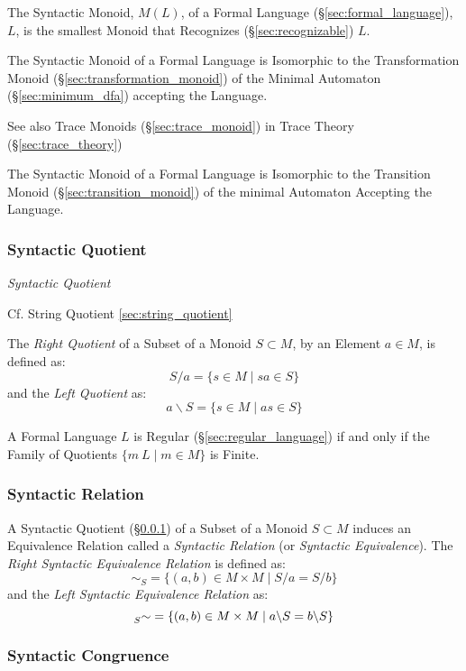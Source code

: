 The Syntactic Monoid, $M(L)$, of a Formal Language
(\S\ref{sec:formal_language}), $L$, is the smallest Monoid that
Recognizes (\S\ref{sec:recognizable}) $L$.

The Syntactic Monoid of a Formal Language is Isomorphic to the
Transformation Monoid (\S\ref{sec:transformation_monoid}) of the
Minimal Automaton (\S\ref{sec:minimum_dfa}) accepting the Language.

\fist See also Trace Monoids (\S\ref{sec:trace_monoid}) in Trace
Theory (\S\ref{sec:trace_theory})

The Syntactic Monoid of a Formal Language is Isomorphic to the
Transition Monoid (\S\ref{sec:transition_monoid}) of the minimal
Automaton Accepting the Language.



\subsubsection{Syntactic Quotient}\label{sec:syntactic_quotient}

\emph{Syntactic Quotient}

\fist Cf. String Quotient \ref{sec:string_quotient}

The \emph{Right Quotient} of a Subset of a Monoid $S \subset M$, by an
Element $a \in M$, is defined as:
\[
  S / a = \{ s \in M\;|\;sa \in S \}
\]
and the \emph{Left Quotient} as:
\[
  a \backslash S = \{ s \in M\;|\;as \in S \}
\]

A Formal Language $L$ is Regular (\S\ref{sec:regular_language}) if and
only if the Family of Quotients $\{ m \ L \;|\; m \in M \}$ is Finite.



\subsubsection{Syntactic Relation}\label{sec:syntactic_relation}

A Syntactic Quotient (\S\ref{sec:syntactic_quotient}) of a Subset of a
Monoid $S \subset M$ induces an Equivalence Relation called a
\emph{Syntactic Relation} (or \emph{Syntactic Equivalence}). The
\emph{Right Syntactic Equivalence Relation} is defined as:
\[
  \sim_S = \{ (a,b) \in M \times M \;|\; S/a = S/b\}
\]
and the \emph{Left Syntactic Equivalence Relation} as:
\[
  \prescript{}{S}{\sim} = \{ (a,b) \in M \times M \;|\;
  a \backslash S = b \backslash S \}
\]



\subsubsection{Syntactic Congruence}\label{sec:syntactic_congruence}

